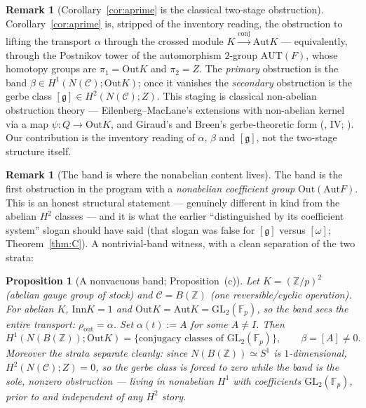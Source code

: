 \documentclass[11pt]{article}
\newtheorem{proposition}[theorem]{Proposition}
\theoremstyle{definition}
\newtheorem{remark}[theorem]{Remark}
\newcommand{\C}{\mathcal{C}}
\newcommand{\Z}{\mathbb{Z}}
\newcommand{\Aut}{\mathrm{Aut}}
\newcommand{\Inn}{\mathrm{Inn}}
\newcommand{\Out}{\mathrm{Out}}
\newcommand{\Zc}{Z}
\newcommand{\gerbe}{\mathfrak{g}}
\newcommand{\GL}{\mathrm{GL}}
\begin{document}
\begin{remark}[Corollary~\ref{cor:aprime} is the classical two-stage obstruction]\label{rem:postnikov}
Corollary~\ref{cor:aprime} is, stripped of the inventory reading, the obstruction to lifting the
transport $\alpha$ through the crossed module $K\xrightarrow{\mathrm{conj}}\Aut K$ --- equivalently,
through the Postnikov tower of the automorphism $2$-group $\mathrm{AUT}(F)$, whose homotopy groups
are $\pi_1=\Out K$ and $\pi_2=\Zc$. The \emph{primary} obstruction is the band
$\beta\in H^1(N(\C);\Out K)$; once it vanishes the \emph{secondary} obstruction is the gerbe class
$[\gerbe]\in H^2(N(\C);\Zc)$. This staging is classical non-abelian obstruction theory ---
Eilenberg--MacLane's extensions with non-abelian kernel via a map $\psi:Q\to\Out K$, and Giraud's
and Breen's gerbe-theoretic form (\cite{giraud}, IV; \cite{breen}). Our contribution is the
inventory reading of $\alpha$, $\beta$ and $[\gerbe]$, not the two-stage structure itself.
\end{remark}

\begin{remark}[The band is where the nonabelian content lives]\label{rem:band-nonabelian}
The band is the first obstruction in the program with a \emph{nonabelian coefficient group}
$\Out(\Aut F)$. This is an honest structural statement --- genuinely different in kind from the
abelian $H^2$ classes --- and it is what the earlier ``distinguished by its coefficient system''
slogan should have said (that slogan was false for $[\gerbe]$ versus $[\omega]$;
Theorem~\ref{thm:C}). A nontrivial-band witness, with a clean separation of the two strata:
\end{remark}

\begin{proposition}[A nonvacuous band; Proposition~(c)]\label{prop:bandwitness}
Let $K=(\Z/p)^2$ (abelian gauge group of stock) and $\C=B(\Z)$ (one reversible/cyclic operation).
For abelian $K$, $\Inn K=1$ and $\Out K=\Aut K=\GL_2(\mathbb F_p)$, so the band sees the entire
transport: $\rho_{\mathrm{out}}=\alpha$. Set $\alpha(t):=A$ for some $A\ne I$. Then
\[
H^1(N(B(\Z));\Out K)=\{\text{conjugacy classes of }\GL_2(\mathbb F_p)\},\qquad \beta=[A]\neq0.
\]
Moreover the strata separate cleanly: since $N(B(\Z))\simeq S^1$ is $1$-dimensional,
$H^2(N(\C);\Zc)=0$, so the gerbe class is \emph{forced} to zero while the band is the sole, nonzero
obstruction --- living in nonabelian $H^1$ with coefficients $\GL_2(\mathbb F_p)$, prior to and
independent of any $H^2$ story.
\end{proposition}
\end{document}
